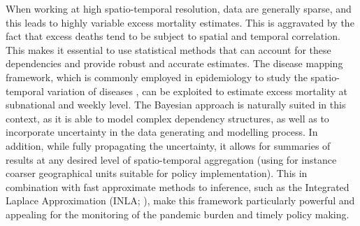 When working at high spatio-temporal resolution, data are generally sparse, and this leads to highly variable excess mortality estimates. This is aggravated by the fact that excess deaths tend to be subject to spatial and temporal correlation. This makes it essential to use statistical methods that can account for these dependencies and provide robust and accurate estimates. The disease mapping framework, which is commonly employed in epidemiology to study the spatio-temporal variation of diseases \citep{waller1997hierarchical, moragarjournal}, can be exploited to estimate excess mortality at subnational and weekly level. The Bayesian approach is naturally suited in this context, as it is able to model complex dependency structures, as well as to incorporate uncertainty in the data generating and modelling process. In addition, while fully propagating the uncertainty, it allows for summaries of results at any desired level of spatio-temporal aggregation (using for instance coarser geographical units suitable for policy implementation). This in combination with fast approximate methods to inference, such as the Integrated Laplace Approximation (INLA; \citealp{rue2009approximate}), make this framework particularly powerful and appealing for the monitoring of the pandemic burden and timely policy making.

